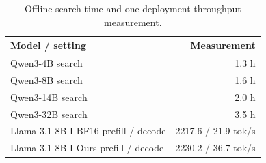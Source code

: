 \begin{table}[t]\centering\small
\caption{Offline search time and one deployment throughput measurement.}
\label{tab:efficiency}
\begin{tabular}{lr}\toprule Model / setting & Measurement\\\midrule
Qwen3-4B search & 1.3 h\\ Qwen3-8B search & 1.6 h\\ Qwen3-14B search & 2.0 h\\ Qwen3-32B search & 3.5 h\\\midrule
Llama-3.1-8B-I BF16 prefill / decode & 2217.6 / 21.9 tok/s\\
Llama-3.1-8B-I Ours prefill / decode & 2230.2 / 36.7 tok/s\\\bottomrule
\end{tabular}\end{table}
